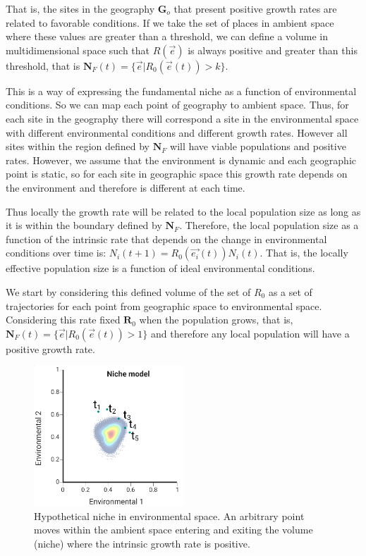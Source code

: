 \documentclass[
]{article}
\begin{document}
That is, the sites in the geography \(\mathbf{G}_o\) that present
positive growth rates are related to favorable conditions. If we take
the set of places in ambient space where these values are greater than a
threshold, we can define a volume in multidimensional space such that
\(R(\vec{e})\) is always positive and greater than this threshold, that
is \(\mathbf{N}_F(t) = \{\vec{e} | R_0(\vec{e}(t)) > k \}\).

This is a way of expressing the fundamental niche as a function of
environmental conditions. So we can map each point of geography to
ambient space. Thus, for each site in the geography there will
correspond a site in the environmental space with different
environmental conditions and different growth rates. However all sites
within the region defined by \(\mathbf{N}_F\) will have viable
populations and positive rates. However, we assume that the environment
is dynamic and each geographic point is static, so for each site in
geographic space this growth rate depends on the environment and
therefore is different at each time.

Thus locally the growth rate will be related to the local population
size as long as it is within the boundary defined by \(\mathbf{N}_F\).
Therefore, the local population size as a function of the intrinsic rate
that depends on the change in environmental conditions over time is:
\(N_i(t+1) = R_0(\vec{e_i}(t) ) N_i(t)\). That is, the locally effective
population size is a function of ideal environmental conditions.

We start by considering this defined volume of the set of \(R_0\) as a
set of trajectories for each point from geographic space to
environmental space. Considering this rate fixed \(\mathbf{R}_0\) when
the population grows, that is,
\(\mathbf{N}_F(t) = \{\vec{e} | R_0(\vec{e}(t)) > 1 \}\) and therefore
any local population will have a positive growth rate.

\begin{figure}
\centering
\includegraphics[width=0.5\textwidth,height=\textheight]{all_figures/figure_1.png}
\caption{Hypothetical niche in environmental space. An arbitrary point
moves within the ambient space entering and exiting the volume (niche)
where the intrinsic growth rate is positive.}
\end{figure}
\end{document}
